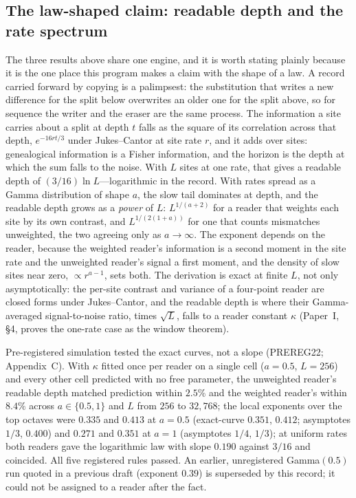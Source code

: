 \documentclass[11pt]{article}
\begin{document}
\subsection{The law-shaped claim: readable depth and the rate spectrum}

The three results above share one engine, and it is worth stating plainly because it is the one place this program makes a claim with the shape of a law. A record carried forward by copying is a palimpsest: the substitution that writes a new difference for the split below overwrites an older one for the split above, so for sequence the writer and the eraser are the same process. The information a site carries about a split at depth $t$ falls as the square of its correlation across that depth, $e^{-16rt/3}$ under Jukes--Cantor at site rate $r$, and it adds over sites: genealogical information is a Fisher information, and the horizon is the depth at which the sum falls to the noise. With $L$ sites at one rate, that gives a readable depth of $(3/16)\ln L$---logarithmic in the record. With rates spread as a Gamma distribution of shape $a$, the slow tail dominates at depth, and the readable depth grows as a \emph{power} of $L$: $L^{1/(a+2)}$ for a reader that weights each site by its own contrast, and $L^{1/(2(1+a))}$ for one that counts mismatches unweighted, the two agreeing only as $a\to\infty$. The exponent depends on the reader, because the weighted reader's information is a second moment in the site rate and the unweighted reader's signal a first moment, and the density of slow sites near zero, $\propto r^{a-1}$, sets both. The derivation is exact at finite $L$, not only asymptotically: the per-site contrast and variance of a four-point reader are closed forms under Jukes--Cantor, and the readable depth is where their Gamma-averaged signal-to-noise ratio, times $\sqrt L$, falls to a reader constant $\kappa$ (Paper~I, \S4, proves the one-rate case as the window theorem).

Pre-registered simulation tested the exact curves, not a slope (PREREG22; Appendix~C). With $\kappa$ fitted once per reader on a single cell ($a=0.5$, $L=256$) and every other cell predicted with no free parameter, the unweighted reader's readable depth matched prediction within $2.5\%$ and the weighted reader's within $8.4\%$ across $a\in\{0.5,1\}$ and $L$ from $256$ to $32{,}768$; the local exponents over the top octaves were $0.335$ and $0.413$ at $a=0.5$ (exact-curve $0.351$, $0.412$; asymptotes $1/3$, $0.400$) and $0.271$ and $0.351$ at $a=1$ (asymptotes $1/4$, $1/3$); at uniform rates both readers gave the logarithmic law with slope $0.190$ against $3/16$ and coincided. All five registered rules passed. An earlier, unregistered Gamma$(0.5)$ run quoted in a previous draft (exponent $0.39$) is superseded by this record; it could not be assigned to a reader after the fact.
\end{document}
